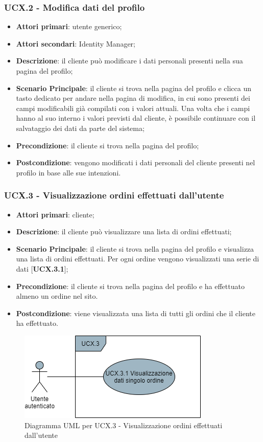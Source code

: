 \subsubsection{UCX.2 - Modifica dati del profilo}
\begin{itemize}
\item \textbf{Attori primari}: utente generico;
\item \textbf{Attori secondari}: Identity Manager;
\item \textbf{Descrizione}: il cliente può modificare i dati personali presenti nella sua pagina del profilo;
\item \textbf{Scenario Principale}: il cliente si trova nella pagina del profilo e clicca un tasto dedicato per andare nella pagina di modifica, in cui sono presenti dei campi modificabili già compilati con i valori attuali. Una volta che i campi hanno al suo interno i valori previsti dal cliente, è possibile continuare con il salvataggio dei dati da parte del sistema;
\item \textbf{Precondizione}: il cliente si trova nella pagina del profilo;
\item \textbf{Postcondizione}: vengono modificati i dati personali del cliente presenti nel profilo in base alle sue intenzioni.
\end{itemize}

\subsubsection{UCX.3 - Visualizzazione ordini effettuati dall'utente}
\begin{itemize}
\item \textbf{Attori primari}: cliente;
\item \textbf{Descrizione}: il cliente può visualizzare una lista di ordini effettuati;
\item \textbf{Scenario Principale}: il cliente si trova nella pagina del profilo e visualizza una lista di ordini effettuati. Per ogni ordine vengono visualizzati una serie di dati [\textbf{UCX.3.1}];
\item \textbf{Precondizione}: il cliente si trova nella pagina del profilo e ha effettuato almeno un ordine nel sito.
\item \textbf{Postcondizione}: viene visualizzata una lista di tutti gli ordini che il cliente ha effettuato.
\end{itemize}

\begin{figure}[H]
\centering
\includegraphics[scale=0.6]{res/UseCase/Immagini/VisualizzazioneOrdini}
\caption{Diagramma UML per UCX.3 - Visualizzazione ordini effettuati dall'utente}
\end{figure}

